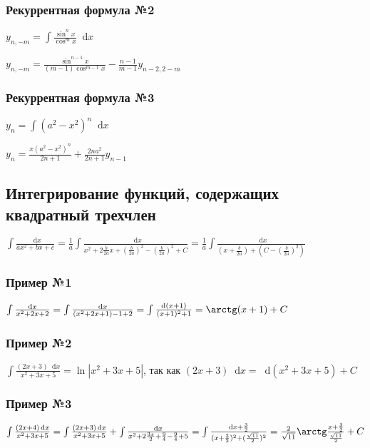 \documentclass{article}
\newcommand*\diff{\mathop{}\!\mathrm{d}}
\begin{document}
\subsubsection{Рекуррентная формула №2}

$y_{n, - m} = \int \frac{\sin^{n} x}{\cos^{m} x} \diff x$

$y_{n, - m} = \frac{\sin^{n - 1} x}{(m - 1) \cos^{m - 1} x} - \frac{n - 1}{m - 1} y_{n - 2, 2 - m}$

\subsubsection{Рекуррентная формула №3}

$y_{n} = \int (a^2 - x^2)^{n} \diff x$

$y_{n} = \frac{x (a^2 - x^2)^{n}}{2 n + 1} + \frac{2 n a^2}{2 n + 1} y_{n - 1}$

\subsection{Интегрирование функций, содержащих квадратный трехчлен}

$\int \frac{\diff x}{a x^2 + b x + c} = \frac{1}{a} \int \frac{\diff x}{x^2 + 2 \frac{b}{2 a} x + (\frac{b}{2 a})^2 - (\frac{b}{2 a})^2 + C} = \frac{1}{a} \int \frac{\diff x}{(x + \frac{b}{2 a}) + (C - (\frac{b}{2 a})^2)}$

\subsubsection{Пример №1}

$\int \frac{\diff x}{x^2 + 2x + 2} = \int \frac{\diff x}{(x^2 + 2 x + 1) - 1 + 2} = \int \frac{\diff (x + 1)}{(x + 1)^2 + 1} = \arctg (x + 1) + C$

\subsubsection{Пример №2}

$\int \frac{(2 x + 3) \diff x}{x^2 + 3x + 5} = \ln |x^2 + 3x + 5|$, так как $(2 x + 3) \diff x = \diff (x^2 + 3x + 5) + C$

\subsubsection{Пример №3}

$\int \frac{(2 x + 4) \diff x}{x^2 + 3x + 5} = \int \frac{(2 x + 3) \diff x}{x^2 + 3x + 5} + \int \frac{\diff x}{x^2 + 2 \frac{3 x}{2} + \frac{9}{4} - \frac{9}{4} + 5} = \int \frac{\diff x + \frac{3}{2}}{(x + \frac{3}{2})^2 + (\frac{\sqrt{11}}{2})^{2}} = \frac{2}{\sqrt{11}} \arctg \frac{x + \frac{3}{2}}{\frac{\sqrt{11}}{2}} + C $
\end{document}
